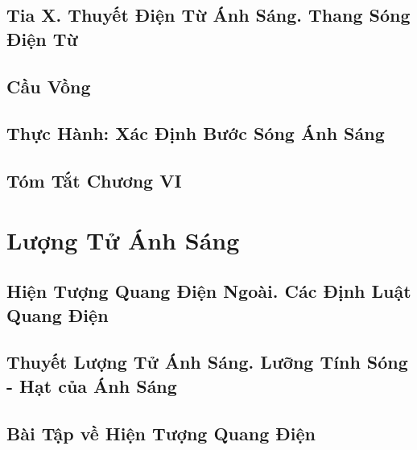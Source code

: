 \documentclass{article}
\numberwithin{equation}{section}
\begin{document}

\subsection{Tia X. Thuyết Điện Từ Ánh Sáng. Thang Sóng Điện Từ}


\subsection{Cầu Vồng}


\subsection{Thực Hành: Xác Định Bước Sóng Ánh Sáng}


\subsection{Tóm Tắt Chương VI}


\section{Lượng Tử Ánh Sáng}

\subsection{Hiện Tượng Quang Điện Ngoài. Các Định Luật Quang Điện}


\subsection{Thuyết Lượng Tử Ánh Sáng. Lưỡng Tính Sóng - Hạt của Ánh Sáng}


\subsection{Bài Tập về Hiện Tượng Quang Điện}
\end{document}
